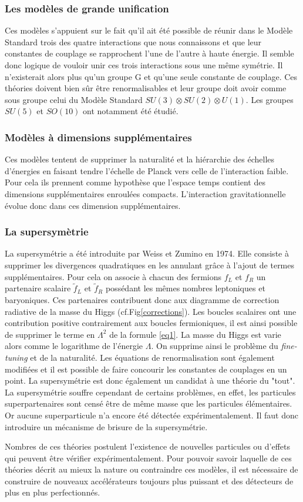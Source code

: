 \subsubsection{Les modèles de grande unification}
Ces modèles s'appuient sur le fait qu'il ait été possible de réunir dans le Modèle Standard trois des quatre interactions que nous connaissons et que leur constantes de couplage se rapprochent l'une de l'autre à haute énergie. Il semble donc logique de vouloir unir ces trois interactions sous une même symétrie. Il n'existerait alors plus qu'un groupe G et qu'une seule constante de couplage. Ces théories doivent bien sûr être renormalisables et leur groupe doit avoir comme sous groupe celui du Modèle Standard $SU(3)\otimes SU(2) \otimes U(1)$. Les groupes $SU(5)$ et $SO(10)$ ont notamment été étudié.

\subsubsection{Modèles à dimensions supplémentaires}
Ces modèles tentent de supprimer la naturalité et la hiérarchie des échelles d'énergies en faisant tendre l'échelle de Planck vers celle de l'interaction faible. Pour cela ils prennent comme hypothèse que l'espace temps contient des dimensions supplémentaires enroulées compacts. L'interaction gravitationnelle évolue donc dans ces dimension supplémentaires.

\subsubsection{La supersymètrie}
La supersymétrie a été introduite par Weiss et Zumino en \num{1974}. Elle consiste à supprimer les divergences quadratiques  en les annulant grâce à l'ajout de termes supplémentaires. Pour cela on associe à chacun des fermions $f_{L}$ et $f_{R}$ un partenaire scalaire $\tilde{f}_{L}$ et $\tilde{f}_{R}$ possédant les mêmes nombres leptoniques et baryoniques. Ces partenaires contribuent donc aux diagramme de correction radiative de la masse du Higgs (cf.Fig\ref{corrections}). Les boucles scalaires ont une contribution positive contrairement aux boucles fermioniques, il est ainsi possible de supprimer le terme en $\Lambda^2$ de la formule \ref{eq1}. La masse du Higgs est varie alors comme le logarithme de l'énergie $\Lambda$. On supprime ainsi le problème du \textit{fine-tuning} et de la naturalité. Les équations de renormalisation sont également modifiées et il est possible de faire concourir les constantes de couplages en un point. La supersymétrie est donc également un candidat à une théorie du "tout". La supersymétrie souffre cependant de certains problèmes, en effet, les particules superpartenaires sont censé être de même masse que les particules élémentaires. Or aucune superparticule n'a encore été détectée expérimentalement. Il faut donc introduire un mécanisme de brisure de la supersymétrie.

Nombres de ces théories postulent l'existence de nouvelles particules ou d'effets qui peuvent être vérifier expérimentalement. Pour pouvoir savoir laquelle de ces théories décrit au mieux la nature ou contraindre ces modèles, il est nécessaire de construire de nouveaux accélérateurs toujours plus puissant et des détecteurs de plus en plus perfectionnés. 
